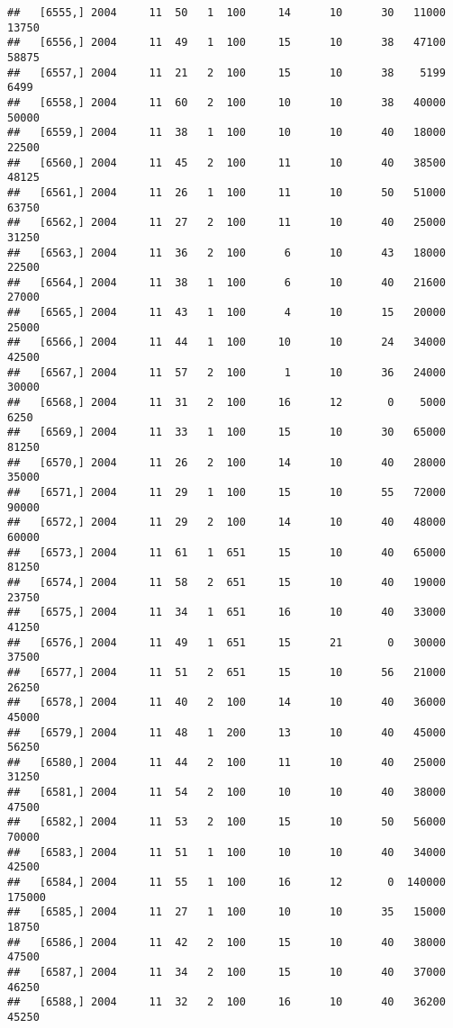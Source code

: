 \documentclass{article}\usepackage[]{graphicx}\usepackage[]{color}
\makeatletter
\newenvironment{kframe}{%
 \def\at@end@of@kframe{}%
 \ifinner\ifhmode%
  \def\at@end@of@kframe{\end{minipage}}%
  \begin{minipage}{\columnwidth}%
 \fi\fi%
 \def\FrameCommand##1{\hskip\@totalleftmargin \hskip-\fboxsep
 \colorbox{shadecolor}{##1}\hskip-\fboxsep
     \hskip-\linewidth \hskip-\@totalleftmargin \hskip\columnwidth}%
 \MakeFramed {\advance\hsize-\width
   \@totalleftmargin\z@ \linewidth\hsize
   \@setminipage}}%
 {\par\unskip\endMakeFramed%
 \at@end@of@kframe}
\newenvironment{knitrout}{}{} %
\makeatother
\begin{document}
\begin{knitrout}
\begin{kframe}
\begin{verbatim}
##   [6555,] 2004     11  50   1  100     14      10      30   11000   13750
##   [6556,] 2004     11  49   1  100     15      10      38   47100   58875
##   [6557,] 2004     11  21   2  100     15      10      38    5199    6499
##   [6558,] 2004     11  60   2  100     10      10      38   40000   50000
##   [6559,] 2004     11  38   1  100     10      10      40   18000   22500
##   [6560,] 2004     11  45   2  100     11      10      40   38500   48125
##   [6561,] 2004     11  26   1  100     11      10      50   51000   63750
##   [6562,] 2004     11  27   2  100     11      10      40   25000   31250
##   [6563,] 2004     11  36   2  100      6      10      43   18000   22500
##   [6564,] 2004     11  38   1  100      6      10      40   21600   27000
##   [6565,] 2004     11  43   1  100      4      10      15   20000   25000
##   [6566,] 2004     11  44   1  100     10      10      24   34000   42500
##   [6567,] 2004     11  57   2  100      1      10      36   24000   30000
##   [6568,] 2004     11  31   2  100     16      12       0    5000    6250
##   [6569,] 2004     11  33   1  100     15      10      30   65000   81250
##   [6570,] 2004     11  26   2  100     14      10      40   28000   35000
##   [6571,] 2004     11  29   1  100     15      10      55   72000   90000
##   [6572,] 2004     11  29   2  100     14      10      40   48000   60000
##   [6573,] 2004     11  61   1  651     15      10      40   65000   81250
##   [6574,] 2004     11  58   2  651     15      10      40   19000   23750
##   [6575,] 2004     11  34   1  651     16      10      40   33000   41250
##   [6576,] 2004     11  49   1  651     15      21       0   30000   37500
##   [6577,] 2004     11  51   2  651     15      10      56   21000   26250
##   [6578,] 2004     11  40   2  100     14      10      40   36000   45000
##   [6579,] 2004     11  48   1  200     13      10      40   45000   56250
##   [6580,] 2004     11  44   2  100     11      10      40   25000   31250
##   [6581,] 2004     11  54   2  100     10      10      40   38000   47500
##   [6582,] 2004     11  53   2  100     15      10      50   56000   70000
##   [6583,] 2004     11  51   1  100     10      10      40   34000   42500
##   [6584,] 2004     11  55   1  100     16      12       0  140000  175000
##   [6585,] 2004     11  27   1  100     10      10      35   15000   18750
##   [6586,] 2004     11  42   2  100     15      10      40   38000   47500
##   [6587,] 2004     11  34   2  100     15      10      40   37000   46250
##   [6588,] 2004     11  32   2  100     16      10      40   36200   45250

\end{verbatim}
\end{kframe}
\end{knitrout}
\end{document}
